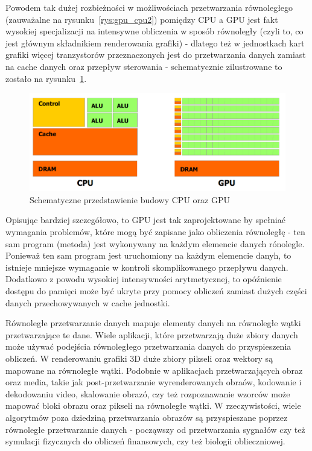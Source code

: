 Powodem tak dużej rozbieżności w możliwościach przetwarzania równoległego (zauważalne na rysunku~\ref{rys:gpu_cpu2}) pomiędzy CPU a GPU jest fakt wysokiej specjalizacji na intensywne obliczenia w sposób równoległy (czyli to, co jest głównym składnikiem renderowania grafiki) - dlatego też w jednostkach kart grafiki więcej tranzystorów przeznaczonych jest do przetwarzania danych zamiast na cache danych oraz przepływ sterowania - schematycznie zilustrowane to zostało na rysunku~\ref{rys:gpu_cpu_trans}.

\begin{figure}[ht]
\centering\includegraphics[width=1.0\textwidth]{figures/03/gpu_cpu_trans.png}
\caption{Schematyczne przedstawienie budowy CPU oraz GPU~\cite{Cuda:PGuide}}\label{rys:gpu_cpu_trans}
\end{figure}

Opisując bardziej szczegółowo, to GPU jest tak zaprojektowane by spełniać wymagania problemów, które mogą być zapisane jako obliczenia równoległę - ten sam program (metoda) jest wykonywany na każdym elemencie danych rónolegle. Ponieważ ten sam program jest uruchomiony na każdym elemencie danyh, to istnieje mniejsze wymaganie w kontroli skomplikowanego przepływu danych. Dodatkowo z powodu wysokiej intensywności arytmetycznej, to opóźnienie dostępu do pamięci może być ukryte przy pomocy obliczeń zamiast dużych części danych przechowywanych w cache jednostki.

Równoległe przetwarzanie danych mapuje elementy danych na równoległe wątki przetwarzające te dane. Wiele aplikacji, które przetwarzają duże zbiory danych może używać podejścia równoległego przetwarzania danych do przyspieszenia obliczeń. W renderowaniu grafiki 3D duże zbiory pikseli oraz wektory są mapowane na równoległe wątki. Podobnie w aplikacjach przetwarzających obraz oraz media, takie jak post-przetwarzanie wyrenderowanych obraów, kodowanie i  dekodowaniu video, skalowanie obrazó, czy też rozpoznawanie wzorców może mapować bloki obrazu oraz pikseli na równoległe wątki. W rzeczywistości, wiele algorytmów poza dziedziną przetwarzania obrazów są przyspieszane poprzez równoległe przetwarzanie danych - począwszy od przetwarzania sygnałów czy też symulacji fizycznych do obliczeń finansowych, czy też biologii oblieczniowej.

